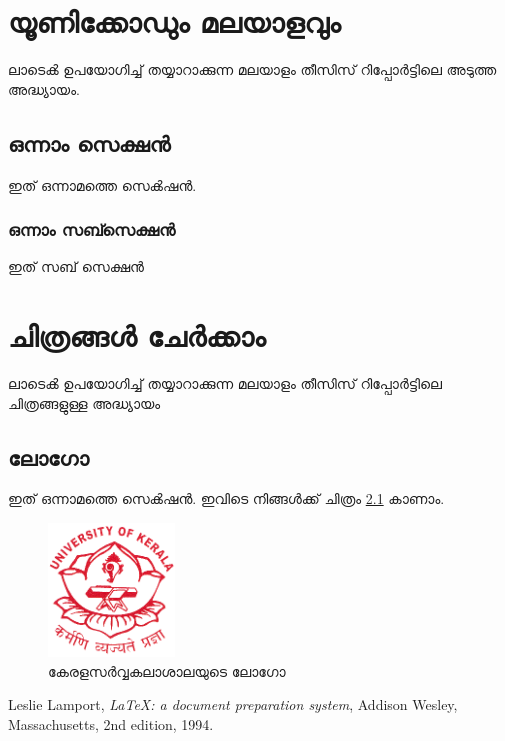 \documentclass[12pt]{report}
\begin{document}
\chapter{യൂണിക്കോഡും മലയാളവും}
ലാടെൿ ഉപയോഗിച്ച് തയ്യാറാക്കുന്ന മലയാളം തീസിസ് റിപ്പോർട്ടിലെ അടുത്ത അദ്ധ്യായം.

\section{ഒന്നാം സെക്ഷൻ}

ഇത് ഒന്നാമത്തെ സെൿഷൻ.

\subsection{ഒന്നാം സബ്സെക്ഷൻ}
ഇത് സബ് സെക്ഷൻ


\chapter{ചിത്രങ്ങൾ ചേർക്കാം}
ലാടെൿ ഉപയോഗിച്ച് തയ്യാറാക്കുന്ന മലയാളം തീസിസ് റിപ്പോർട്ടിലെ ചിത്രങ്ങളുള്ള അദ്ധ്യായം

\section{ലോഗോ}

ഇത് ഒന്നാമത്തെ സെൿഷൻ. ഇവിടെ നിങ്ങൾക്ക് ചിത്രം \ref{logo} കാണാം.

\begin{figure}
\center
\includegraphics[width=0.3\textwidth]{./contents/logo.png}
\caption{കേരളസർവ്വകലാശാലയുടെ ലോഗോ}
\label{logo}
\end{figure}



\begin{thebibliography}{9}

  Leslie Lamport,
  \textit{\LaTeX: a document preparation system},
  Addison Wesley, Massachusetts,
  2nd edition,
  1994.

\end{thebibliography}
\end{document}
